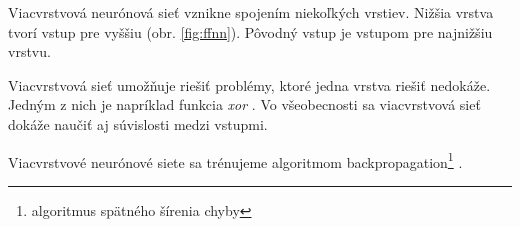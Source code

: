 Viacvrstvová neurónová sieť vznikne spojením niekoľkých vrstiev. Nižšia vrstva tvorí vstup pre vyššiu (obr. \ref{fig:ffnn}). Pôvodný vstup je vstupom pre najnižšiu vrstvu.

Viacvrstvová sieť umožňuje riešiť problémy, ktoré jedna vrstva riešiť nedokáže. Jedným z nich je napríklad funkcia \textit{xor} \cite[s. 197]{haykin1999neural}. Vo všeobecnosti sa viacvrstvová sieť dokáže naučiť aj súvislosti medzi vstupmi.

Viacvrstvové neurónové siete sa trénujeme algoritmom backpropagation\footnote{algoritmus spätného šírenia chyby} \cite{haykin1999neural,dominika2011neural}.

%






